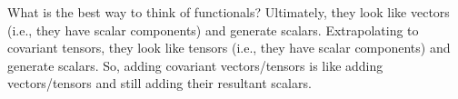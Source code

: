 \documentclass[12pt,a4paper]{report}
\begin{document}
What is the best way to think of functionals?  Ultimately, they look like vectors (i.e., they have scalar components) and generate scalars.  Extrapolating to covariant tensors, they look like tensors (i.e., they have scalar components) and generate scalars.  So, adding covariant vectors/tensors is like adding vectors/tensors and still adding their resultant scalars.
\end{document}
